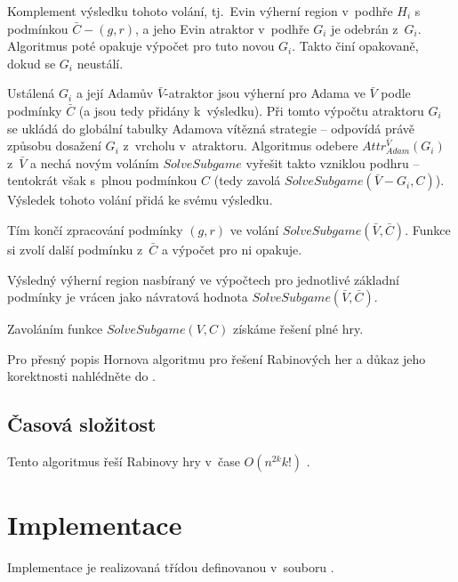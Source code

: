 Komplement výsledku tohoto volání, tj.~Evin výherní region v~podhře $H_i$ s podmínkou $\bar{C} - (g, r)$, a jeho Evin atraktor v~podhře $G_i$ je odebrán z~$G_i$. Algoritmus poté opakuje výpočet pro tuto novou $G_i$. Takto činí opakovaně, dokud se $G_i$ neustálí.

Ustálená $G_i$ a její Adamův $\bar{V}$-atraktor jsou výherní pro Adama ve $\bar{V}$ podle podmínky $\bar{C}$ (a jsou tedy přidány k~výsledku). Při tomto výpočtu atraktoru $G_i$ se ukládá do globální tabulky Adamova vítězná strategie -- odpovídá právě způsobu dosažení $G_i$ z~vrcholu v~atraktoru. Algoritmus odebere $Attr^{\bar{V}}_{Adam}(G_i)$ z~$\bar{V}$ a nechá novým voláním $SolveSubgame$ vyřešit takto vzniklou podhru -- tentokrát však s~plnou podmínkou $C$ (tedy zavolá $SolveSubgame(\bar{V} - G_i, C)$). Výsledek tohoto volání přidá ke svému výsledku.

Tím končí zpracování podmínky $(g, r)$ ve volání $SolveSubgame(\bar{V}, \bar{C})$. Funkce si zvolí další podmínku z~$\bar{C}$ a výpočet pro ni opakuje.

Výsledný výherní region nasbíraný ve výpočtech pro jednotlivé základní podmínky je vrácen jako návratová hodnota $SolveSubgame(\bar{V}, \bar{C})$.

Zavoláním funkce $SolveSubgame(V, C)$ získáme řešení plné hry.

Pro přesný popis Hornova algoritmu pro řešení Rabinových her a důkaz jeho korektnosti nahlédněte do \cite{Horn2005}.
\subsection{Časová složitost} \label{subsec:horn:algoritmus:casovaslozitost}
Tento algoritmus řeší Rabinovy hry v~čase $O(n^{2k}k!)$ \cite[s.~11]{Horn2005}.
\section{Implementace}
Implementace je realizovaná třídou  definovanou v~souboru .
